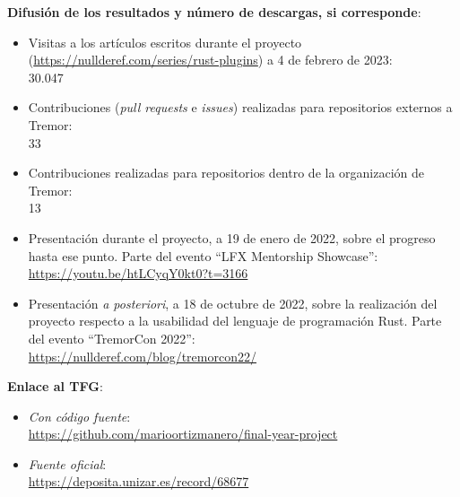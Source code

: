 \documentclass[a4paper,12pt,twoside,hidelinks,openright]{article}
\begin{document}
\textbf{Difusión de los resultados y número de descargas, si corresponde}:\\
\setlength{\parskip}{0cm}%
\begin{itemize}[noitemsep, topsep=0pt]
    \item Visitas a los artículos escritos durante el proyecto
        (\url{https://nullderef.com/series/rust-plugins}) a 4 de febrero de
        2023:\\
        30.047

    \item Contribuciones (\emph{pull requests} e \emph{issues}) realizadas para
        repositorios externos a Tremor:\\
        33

    \item Contribuciones realizadas para repositorios dentro de la organización
        de Tremor:\\
        13

    \item Presentación durante el proyecto, a 19 de enero de 2022, sobre el
        progreso hasta ese punto. Parte del evento ``LFX Mentorship
        Showcase'':\\
        \url{https://youtu.be/htLCyqY0kt0?t=3166}

    \item Presentación \emph{a posteriori}, a 18 de octubre de 2022, sobre la
        realización del proyecto respecto a la usabilidad del lenguaje de
        programación Rust. Parte del evento ``TremorCon 2022'':\\
        \url{https://nullderef.com/blog/tremorcon22/}

\end{itemize}
\setlength{\parskip}{\baselineskip}%

\textbf{Enlace al TFG}:\\
\setlength{\parskip}{0cm}%
\begin{itemize}[noitemsep, topsep=0pt]

    \item \emph{Con código fuente}:\\
        \url{https://github.com/marioortizmanero/final-year-project}

    \item \emph{Fuente oficial}:\\
        \url{https://deposita.unizar.es/record/68677}

\end{itemize}
\setlength{\parskip}{\baselineskip}%
\end{document}
